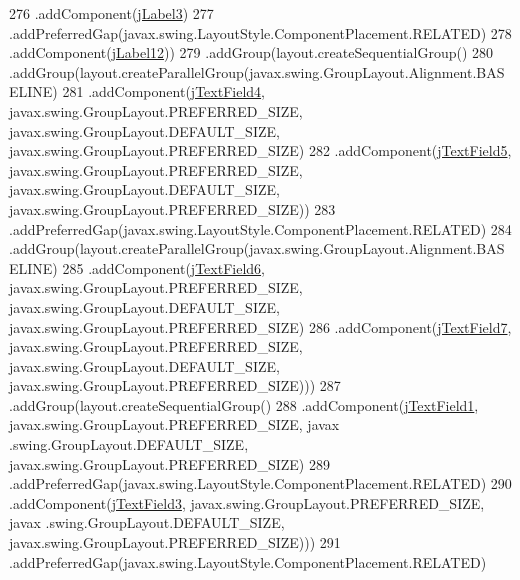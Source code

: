 \begin{DoxyCode}
276                         .addComponent(\mbox{\hyperlink{classsoftware_1_1parasoftware3_a62ceb2511ec08ce64863778ec683c2ef}{jLabel3}})
277                         .addPreferredGap(javax.swing.LayoutStyle.ComponentPlacement.RELATED)
278                         .addComponent(\mbox{\hyperlink{classsoftware_1_1parasoftware3_abbd12b5ff66390642a8541054290bc50}{jLabel12}}))
279                     .addGroup(layout.createSequentialGroup()
280                         .addGroup(layout.createParallelGroup(javax.swing.GroupLayout.Alignment.BASELINE)
281                             .addComponent(\mbox{\hyperlink{classsoftware_1_1parasoftware3_a49b508e80d5a8bb6886b95f79fc5446e}{jTextField4}}, javax.swing.GroupLayout.PREFERRED\_SIZE, 
      javax.swing.GroupLayout.DEFAULT\_SIZE, javax.swing.GroupLayout.PREFERRED\_SIZE)
282                             .addComponent(\mbox{\hyperlink{classsoftware_1_1parasoftware3_acd863025f5ab774c7139623c6dab2f9b}{jTextField5}}, javax.swing.GroupLayout.PREFERRED\_SIZE, 
      javax.swing.GroupLayout.DEFAULT\_SIZE, javax.swing.GroupLayout.PREFERRED\_SIZE))
283                         .addPreferredGap(javax.swing.LayoutStyle.ComponentPlacement.RELATED)
284                         .addGroup(layout.createParallelGroup(javax.swing.GroupLayout.Alignment.BASELINE)
285                             .addComponent(\mbox{\hyperlink{classsoftware_1_1parasoftware3_a38ca1c67c4ebd2265e207c9c76ce72ad}{jTextField6}}, javax.swing.GroupLayout.PREFERRED\_SIZE, 
      javax.swing.GroupLayout.DEFAULT\_SIZE, javax.swing.GroupLayout.PREFERRED\_SIZE)
286                             .addComponent(\mbox{\hyperlink{classsoftware_1_1parasoftware3_a32fd4ba8157830b2185c828121e52320}{jTextField7}}, javax.swing.GroupLayout.PREFERRED\_SIZE, 
      javax.swing.GroupLayout.DEFAULT\_SIZE, javax.swing.GroupLayout.PREFERRED\_SIZE)))
287                     .addGroup(layout.createSequentialGroup()
288                         .addComponent(\mbox{\hyperlink{classsoftware_1_1parasoftware3_a3415ad58f32ae42cfc88f7b498a2db38}{jTextField1}}, javax.swing.GroupLayout.PREFERRED\_SIZE, javax
      .swing.GroupLayout.DEFAULT\_SIZE, javax.swing.GroupLayout.PREFERRED\_SIZE)
289                         .addPreferredGap(javax.swing.LayoutStyle.ComponentPlacement.RELATED)
290                         .addComponent(\mbox{\hyperlink{classsoftware_1_1parasoftware3_a19c3b86c1d29a59d3e2dca7ca6e34e35}{jTextField3}}, javax.swing.GroupLayout.PREFERRED\_SIZE, javax
      .swing.GroupLayout.DEFAULT\_SIZE, javax.swing.GroupLayout.PREFERRED\_SIZE)))
291                 .addPreferredGap(javax.swing.LayoutStyle.ComponentPlacement.RELATED)

\end{DoxyCode}

